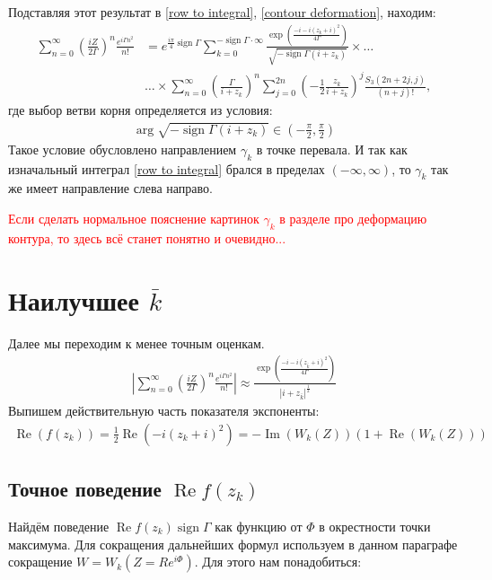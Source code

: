 \documentclass[a4paper, 12pt]{article}
\DeclareMathOperator*{\sign}{sign}
\DeclareMathOperator*{\Real}{Re}
\DeclareMathOperator*{\Imag}{Im}
\newenvironment{eqw}{\begin{equation} \begin{aligned}}   
    {\end{aligned}    \end{equation}}
\begin{document}
Подставляя этот результат в \eqref{row to integral}, \eqref{contour deformation}, находим:
\begin{eqw}
    \sum\limits_{n=0}^{\infty}\left(\frac{iZ}{2\Gamma}\right)^n  \frac{e^{i\Gamma n^2}}{n!} &= e^{\frac{i\pi}{4}\sign\Gamma}
    \sum\limits_{k=0}^{-\sign\Gamma\cdot\infty} \frac{\exp\left(\frac{-i-i(z_k+i)^2}{4\Gamma}\right)}{\sqrt{-\sign \Gamma\left(i+z_k\right)}}
    \times\dots\\
    &\dots\times
    \sum\limits_{n=0}^{\infty}\left(\frac{\Gamma}{i+z_k}\right)^n
    \sum\limits_{j=0}^{2n}\left(-\frac{1}{2}\frac{z_k}{i+z_k}\right)^{j}\frac{S_3(2n+2j, j)}{(n+j)!},
\end{eqw}
где выбор ветви корня определяется из условия:
\begin{eqw}
    \arg\sqrt{-\sign \Gamma\left(i+z_k\right)} \in \left(-\frac{\pi}{2}, \frac{\pi}{2}\right)
\end{eqw}
Такое условие обусловлено направлением $\gamma_k$ в точке перевала. И так как изначальный интеграл \eqref{row to integral} брался в пределах $(-\infty, \infty)$, то $\gamma_k$ так же имеет направление слева направо. 

\textcolor{red}{Если сделать нормальное пояснение картинок $\gamma_k$ в разделе про деформацию контура, то здесь всё станет понятно и очевидно...}


\section*{Наилучшее $\bar k$}
Далее мы переходим к менее точным оценкам.
\begin{eqw}\label{approx_exact_row}
    \left|\sum\limits_{n=0}^{\infty}\left(\frac{iZ}{2\Gamma}\right)^n  \frac{e^{i\Gamma n^2}}{n!} \right|\approx 
    \frac{\exp\left(\frac{-i-i(z_{\bar k}+i)^2}{4\Gamma}\right)}{\left|i+z_{\bar k}\right|^{\frac{1}{2}}}
\end{eqw}
Выпишем действительную часть показателя экспоненты:
\begin{eqw}
    \Real\left(f(z_k)\right) = \frac{1}{2}\Real\left(-i(z_k+i)^2\right) = -\Imag(W_k(Z))\left(1+\Real(W_k(Z))\right)
\end{eqw}
\subsection*{Точное поведение $\Real f(z_k)$}
Найдём поведение $\Real f(z_k)\sign \Gamma$ как функцию от $\Phi$ в окрестности точки максимума. Для сокращения дальнейших формул используем в данном параграфе сокращение $W = W_k(Z=R e^{i\Phi})$. Для этого нам понадобиться:
\end{document}
